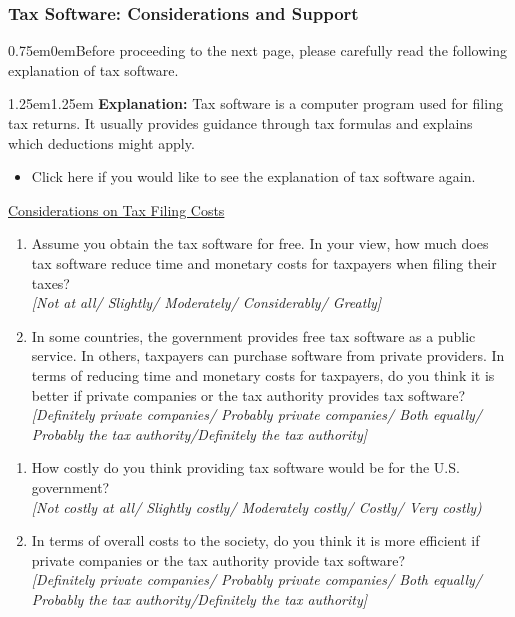 \documentclass[11pt]{article}
\begin{document}
\subsubsection*{Tax Software: Considerations and Support} 
\vspace{0.5em}
\begin{adjustwidth}{0.75em}{0em}Before proceeding to the next page, please carefully read the following explanation of tax software. \end{adjustwidth}
\vspace{0.5em}
\begin{adjustwidth}{1.25em}{1.25em} \textbf{Explanation:} Tax software is a computer program used for filing tax returns. It usually provides guidance through tax formulas and explains which deductions might apply.
\end{adjustwidth}
\begin{itemize}
    \item[$\rightarrow$] Click here if you would like to see the explanation of tax software again.
\end{itemize}
\vspace{0.5em}
\underline{Considerations on Tax Filing Costs}
\begin{enumerate}[resume]
    \item Assume you obtain the tax software for free. In your view, how much does tax software reduce time and monetary costs for taxpayers when filing their taxes?  \\
    \textit{[Not at all/ Slightly/ Moderately/ Considerably/ Greatly]} 
    \item \label{question:providerfilingcost} In some countries, the government provides free tax software as a public service. In others, taxpayers can purchase software from private providers. In terms of reducing time and monetary costs for taxpayers, do you think it is better if private companies or the tax authority provides tax software? \\
    \textit{[Definitely private companies/ Probably private companies/ Both equally/ Probably the tax authority/Definitely the tax authority]}
\end{enumerate}
\begin{enumerate}[resume]
    \item How costly do you think providing tax software would be for the U.S. government? \\
    \textit{[Not costly at all/ Slightly costly/ Moderately costly/ Costly/ Very costly)} 
    \item \label{question:providercost} In terms of overall costs to the society, do you think it is more efficient if private companies or the tax authority provide tax software?  \\
    \textit{[Definitely private companies/ Probably private companies/ Both equally/ Probably the tax authority/Definitely the tax authority]}
\end{enumerate}
\end{document}
